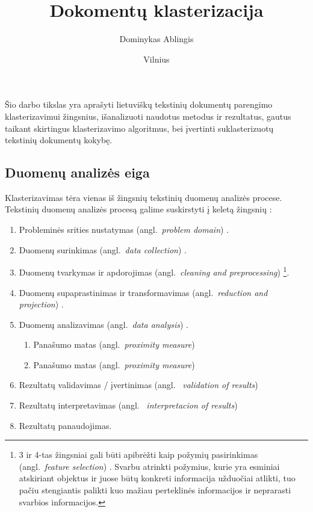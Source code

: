 \documentclass{VUMIFInfKursinis}
\title{Dokomentų klasterizacija}
\author{Dominykas Ablingis}
\date{Vilnius \\ \the\year}
\newcommand{\ltang}[2]{#1 (angl.\  \textit{#2}) }
\begin{document}
\maketitle
\tableofcontents


Šio darbo tikslas yra aprašyti lietuviškų tekstinių dokumentų parengimo
klasterizavimui žingsnius, išanalizuoti naudotus metodus ir rezultatus,
gautus taikant skirtingus klasterizavimo algoritmus, bei įvertinti
suklasterizuotų tekstinių dokumentų kokybę.

\subsection*{Duomenų analizės eiga}

Klasterizavimas tėra vienas iš žingsnių tekstinių duomenų analizės
procese. Tekstinių duomenų analizės procesą galime suskirstyti į keletą
žingsnių \cite{fayyad1996data}:

\begin{enumerate}
\item
	\ltang{Probleminės srities nustatymas}{problem domain}. 
\item
	\ltang{Duomenų surinkimas}{data collection}.
\item
	\ltang{Duomenų tvarkymas ir apdorojimas}{cleaning and
	preprocessing}\footnote{3 ir 4-tas žingsniai gali būti apibrėžti kaip
		\ltang{požymių pasirinkimas}{feature selection}. Svarbu
		atrinkti požymius, kurie yra esminiai atskiriant objektus ir juose
		būtų konkreti informacija užduočiai atlikti, tuo pačiu stengiantis
		palikti kuo mažiau perteklinės informacijos ir neprarasti svarbios
		informacijos.}.
\item
	\ltang{Duomenų supaprastinimas ir transformavimas}{reduction and
	projection}.
\item
	\ltang{Duomenų analizavimas}{data analysis}.

  \begin{enumerate}
  \item
  	\ltang{Panašumo matas}{proximity measure}
  \item
  	\ltang{Panašumo matas}{proximity measure}
  \end{enumerate}
\item
  \ltang{Rezultatų validavimas / įvertinimas }{ validation of
results}
\item
  \ltang{Rezultatų interpretavimas}{ interpretacion of results} 
\item
  Rezultatų panaudojimas. 
\end{enumerate}
\end{document}
